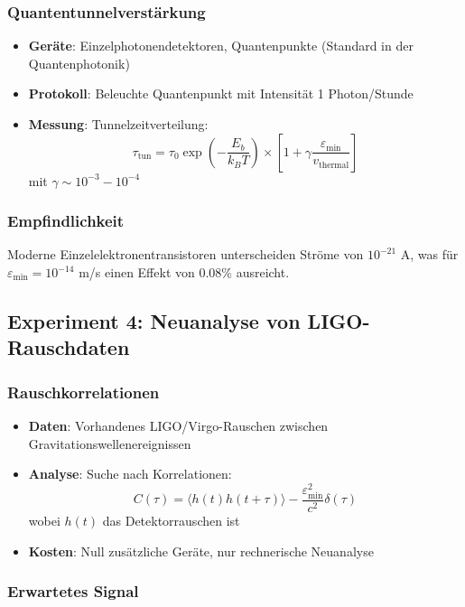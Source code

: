 \documentclass[11pt,a4paper]{article}
\begin{document}
	\subsubsection{Quantentunnelverstärkung}
	
	\begin{itemize}
		\item \textbf{Geräte}: Einzelphotonendetektoren, Quantenpunkte (Standard in der Quantenphotonik)
		\item \textbf{Protokoll}: Beleuchte Quantenpunkt mit Intensität 1 Photon/Stunde
		\item \textbf{Messung}: Tunnelzeitverteilung:
		\[
		\tau_{\text{tun}} = \tau_0 \exp\left(-\frac{E_b}{k_B T}\right) \times \left[1 + \gamma\frac{\varepsilon_{\min}}{v_{\text{thermal}}}\right]
		\]
		mit $\gamma \sim 10^{-3} - 10^{-4}$
	\end{itemize}
	
	\subsubsection{Empfindlichkeit}
	
	Moderne Einzelelektronentransistoren unterscheiden Ströme von $10^{-21}$ A, was für $\varepsilon_{\min} = 10^{-14}$ m/s einen Effekt von 0.08\% ausreicht.
	
	\subsection{Experiment 4: Neuanalyse von LIGO-Rauschdaten}
	
	\subsubsection{Rauschkorrelationen}
	
	\begin{itemize}
		\item \textbf{Daten}: Vorhandenes LIGO/Virgo-Rauschen zwischen Gravitationswellenereignissen
		\item \textbf{Analyse}: Suche nach Korrelationen:
		\[
		C(\tau) = \langle h(t)h(t+\tau)\rangle - \frac{\varepsilon_{\min}^2}{c^2}\delta(\tau)
		\]
		wobei $h(t)$ das Detektorrauschen ist
		\item \textbf{Kosten}: Null zusätzliche Geräte, nur rechnerische Neuanalyse
	\end{itemize}
	
	\subsubsection{Erwartetes Signal}
	
\end{document}
